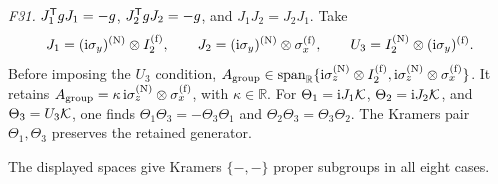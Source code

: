 \medskip\noindent\textit{F31.}\quad
\(J_1^{\mathsf{T}} gJ_1=-g\), \(J_2^{\mathsf{T}} gJ_2=-g\), and
\(J_1J_2=J_2J_1\).
Take
\begin{equation*}
J_1=(\mathrm{i}\sigma_y)^{({\rm N})}\otimes I_2^{({\rm f})},
\qquad
J_2=(\mathrm{i}\sigma_y)^{({\rm N})}\otimes\sigma_x^{({\rm f})},
\qquad
U_3=I_2^{({\rm N})}\otimes(\mathrm{i}\sigma_y)^{({\rm f})}.
\end{equation*}
Before imposing the \(U_3\) condition,
\(A_{\rm group}\in\operatorname{span}_{\mathbb R}
\{\mathrm{i}\sigma_z^{({\rm N})}\otimes I_2^{({\rm f})},
\mathrm{i}\sigma_z^{({\rm N})}\otimes\sigma_x^{({\rm f})}\}\).
It retains
\(A_{\rm group}=\kappa\,\mathrm{i}\sigma_z^{({\rm N})}
\otimes\sigma_x^{({\rm f})}\), with \(\kappa\in\mathbb R\).
For \(\Theta_1=\mathrm{i} J_1\mathcal{K}\), \(\Theta_2=\mathrm{i} J_2\mathcal{K}\), and
\(\Theta_3=U_3\mathcal{K}\), one finds
\(\Theta_1\Theta_3=-\Theta_3\Theta_1\) and
\(\Theta_2\Theta_3=\Theta_3\Theta_2\).
The Kramers pair \(\Theta_1,\Theta_3\) preserves the retained generator.

The displayed spaces give Kramers \(\{-,-\}\) proper subgroups in all eight
cases.

